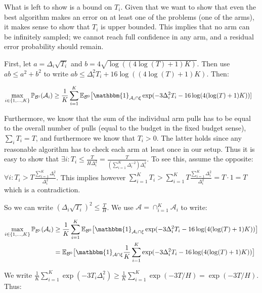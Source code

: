 \documentclass[11pt,]{article}
\begin{document}
What is left to show is a bound on \(T_i\). Given that we want to show
that even the best algorithm makes an error on at least one of the
problems (one of the arms), it makes sense to show that \(T_i\) is upper
bounded. This implies that no arm can be infinitely sampled; we cannot
reach full confidence in any arm, and a residual error probability
should remain.

First, let \(a = \Delta_i \sqrt{T_i}\) and
\(b = 4\sqrt{\log((4\log(T)+1)K)}\). Then use \(ab \leq a^2 + b^2\) to
write \(ab \leq \Delta_i^2 T_i + 16\log((4\log(T)+1)K)\). Then:

\begin{align*}
\max_{i \in \{1,\dots,K\}} \mathbb{P}_{\mathcal{B}^i}(\mathcal{A}_i) & \geq \frac{1}{K} \sum_{i=1}^{K} \mathbb{E}_{\mathcal{B}^0} \big[\mathbbm{1}_{\mathcal{A}_i \cap \xi} \exp (- 3 \Delta_i^2 T_i - 16 \log(4(\log(T)+1)K)) ]
\end{align*}

Furthermore, we know that the sum of the individual arm pulls has to be
equal to the overall number of pulls (equal to the budget in the fixed
budget sense), \(\sum_i T_i = T\), and furthermore we know that
\(T_i>0\). The latter holds since any reasonable algorithm has to check
each arm at least once in our setup. Thus it is easy to show that
\(\exists i: T_i \leq \frac{T}{H \Delta_i^2} = \frac{T}{(\sum_{i=1}^{K} \Delta_i^{-2}) \Delta_i^2}\).
To see this, assume the opposite:
\(\forall i: T_i > T \frac{\sum_{i=1}^K \Delta_i^2}{\Delta_i^2}\). This
implies however
\(\sum_{i=1}^K T_i > \sum_{i=1}^K T \frac{\sum_{i=1}^K \Delta_i^2}{\Delta_i^2} = T \cdot 1 = T\)
which is a contradiction.

So we can write \((\Delta_i \sqrt{T_i})^2 \leq \frac{T}{H}\). We use
\(\mathcal{A} = \cap_{i=1}^K \mathcal{A}_i\) to write:

\begin{align*}
\max_{i \in \{1,\dots,K\}} \mathbb{P}_{\mathcal{B}^i}(\mathcal{A}_i) & \geq \frac{1}{K} \sum_{i=1}^{K} \mathbb{E}_{\mathcal{B}^0} \big[\mathbbm{1}_{\mathcal{A}_i \cap \xi} \exp (- 3 \Delta_i^2 T_i - 16 \log(4(\log(T)+1)K)) \big] \\
& = \mathbb{E}_{\mathcal{B}^0} \big[\mathbbm{1}_{\mathcal{A} \cap \xi} \frac{1}{K} \sum_{i=1}^{K} \exp (- 3 \Delta_i^2 T_i - 16 \log(4(\log(T)+1)K)) \big]
\end{align*}

We write
\(\frac{1}{K} \sum_{i=1}^K \exp(-3T_i \Delta_i^2) \geq \frac{1}{K} \sum_{i=1}^K \exp(-3 T/H) = \exp(-3 T/H)\).
Thus:
\end{document}
